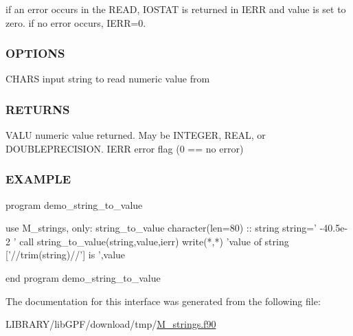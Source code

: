 if an error occurs in the R\+E\+AD, I\+O\+S\+T\+AT is returned in I\+E\+RR and value is set to zero. if no error occurs, I\+E\+RR=0. \subsubsection*{O\+P\+T\+I\+O\+NS}

C\+H\+A\+RS input string to read numeric value from \subsubsection*{R\+E\+T\+U\+R\+NS}

V\+A\+LU numeric value returned. May be I\+N\+T\+E\+G\+ER, R\+E\+AL, or D\+O\+U\+B\+L\+E\+P\+R\+E\+C\+I\+S\+I\+ON. I\+E\+RR error flag (0 == no error) \subsubsection*{E\+X\+A\+M\+P\+LE}

\begin{DoxyVerb}program demo_string_to_value

 use M_strings, only: string_to_value
 character(len=80) :: string
    string=' -40.5e-2 '
    call string_to_value(string,value,ierr)
    write(*,*) 'value of string ['//trim(string)//'] is ',value

end program demo_string_to_value \end{DoxyVerb}
 

The documentation for this interface was generated from the following file\+:\begin{DoxyCompactItemize}
\item 
L\+I\+B\+R\+A\+R\+Y/lib\+G\+P\+F/download/tmp/\hyperlink{M__strings_8f90}{M\+\_\+strings.\+f90}\end{DoxyCompactItemize}
